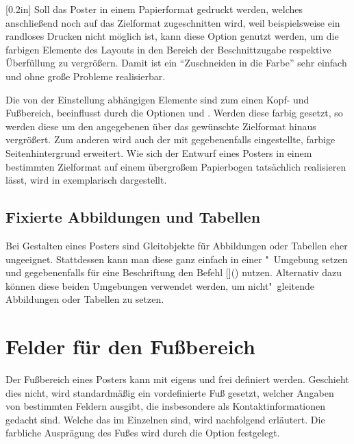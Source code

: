 \begin{Bundle*}[v2.05]{}
\begin{Declaration}{}[0.2in]
\printdeclarationlist%
%
%
%
Soll das Poster in einem Papierformat gedruckt werden, welches anschließend 
noch auf das Zielformat zugeschnitten wird, weil beispielsweise ein randloses 
Drucken nicht möglich ist, kann diese Option genutzt werden, um die farbigen 
Elemente des Layouts in den Bereich der Beschnittzugabe respektive Überfüllung 
zu vergrößern. Damit ist ein \enquote{Zuschneiden in die Farbe} sehr einfach 
und ohne große Probleme realisierbar.

Die von der Einstellung  abhängigen 
Elemente sind zum einen Kopf- und Fußbereich, beeinflusst durch die Optionen 
 und . Werden diese farbig gesetzt, so werden 
diese um den angegebenen  über das gewünschte Zielformat 
hinaus vergrößert. Zum anderen wird auch der mit  
gegebenenfalls eingestellte, farbige Seitenhintergrund erweitert. Wie sich der 
Entwurf eines Posters in einem bestimmten Zielformat auf einem übergroßem 
Papierbogen tatsächlich realisieren lässt, wird in  
exemplarisch dargestellt.
\end{Declaration}



\subsection{Fixierte Abbildungen und Tabellen}

\begin{Declaration}[v2.06e]{}
\begin{Declaration}[v2.06e]{}
\printdeclarationlist%
%
Bei Gestalten eines Posters sind Gleitobjekte für Abbildungen oder Tabellen 
eher ungeeignet. Stattdessen kann man diese ganz einfach in einer 
"~Umgebung setzen und gegebenenfalls für eine 
Beschriftung den Befehl %
[]() nutzen. 
Alternativ dazu können diese beiden Umgebungen verwendet werden, um 
nicht"~gleitende Abbildungen oder Tabellen zu setzen.
\end{Declaration}
\end{Declaration}



\section{Felder für den Fußbereich}
%
%
Der Fußbereich eines Posters kann mit  eigens und frei 
definiert werden. Geschieht dies nicht, wird standardmäßig ein vordefinierte 
Fuß gesetzt, welcher Angaben von bestimmten Feldern ausgibt, die insbesondere 
als Kontaktinformationen gedacht sind. Welche das im Einzelnen sind, wird 
nachfolgend erläutert. Die farbliche Ausprägung des Fußes wird durch die Option
 festgelegt.


\end{Bundle*}
